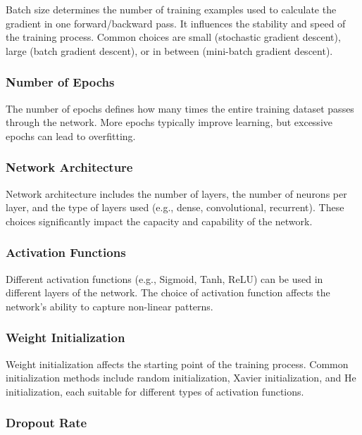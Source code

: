 \documentclass{report}
\begin{document}
        Batch size determines the number of training examples used to calculate the gradient in one forward/backward pass. It influences the stability and speed of the training process. Common choices are small (stochastic gradient descent), large (batch gradient descent), or in between (mini-batch gradient descent).
        
        \subsubsection{Number of Epochs}
        
        The number of epochs defines how many times the entire training dataset passes through the network. More epochs typically improve learning, but excessive epochs can lead to overfitting.
        
        \subsubsection{Network Architecture}
        
        Network architecture includes the number of layers, the number of neurons per layer, and the type of layers used (e.g., dense, convolutional, recurrent). These choices significantly impact the capacity and capability of the network.
        
        \subsubsection{Activation Functions}
        
        Different activation functions (e.g., Sigmoid, Tanh, ReLU) can be used in different layers of the network. The choice of activation function affects the network's ability to capture non-linear patterns.
        
        \subsubsection{Weight Initialization}
        
        Weight initialization affects the starting point of the training process. Common initialization methods include random initialization, Xavier initialization, and He initialization, each suitable for different types of activation functions.
        
        \subsubsection{Dropout Rate}
        
\end{document}
